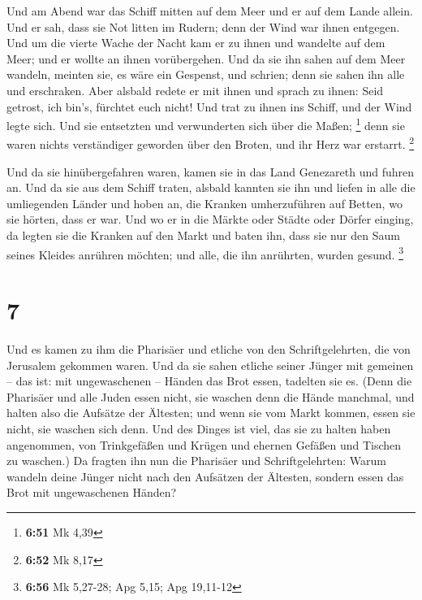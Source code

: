  Und am Abend war das Schiff mitten auf dem Meer und er
auf dem Lande allein.  Und er sah, dass sie Not litten im
Rudern; denn der Wind war ihnen entgegen. Und um die vierte Wache der
Nacht kam er zu ihnen und wandelte auf dem Meer;  und er
wollte an ihnen vorübergehen. Und da sie ihn sahen auf dem Meer wandeln,
meinten sie, es wäre ein Gespenst, und schrien;  denn sie
sahen ihn alle und erschraken. Aber alsbald redete er mit ihnen und
sprach zu ihnen: Seid getrost, ich bin's, fürchtet euch nicht!
 Und trat zu ihnen ins Schiff, und der Wind legte sich.
Und sie entsetzten und verwunderten sich über die Maßen; \footnote{\textbf{6:51}
  Mk 4,39}  denn sie waren nichts verständiger geworden
über den Broten, und ihr Herz war erstarrt. \footnote{\textbf{6:52} Mk
  8,17}

 Und da sie hinübergefahren waren, kamen sie in das Land
Genezareth und fuhren an.  Und da sie aus dem Schiff
traten, alsbald kannten sie ihn  und liefen in alle die
umliegenden Länder und hoben an, die Kranken umherzuführen auf Betten,
wo sie hörten, dass er war.  Und wo er in die Märkte oder
Städte oder Dörfer einging, da legten sie die Kranken auf den Markt und
baten ihn, dass sie nur den Saum seines Kleides anrühren möchten; und
alle, die ihn anrührten, wurden gesund. \footnote{\textbf{6:56} Mk
  5,27-28; Apg 5,15; Apg 19,11-12}

\hypertarget{section-1}{%
\section{7}\label{section-1}}

 Und es kamen zu ihm die Pharisäer und etliche von den
Schriftgelehrten, die von Jerusalem gekommen waren.  Und
da sie sahen etliche seiner Jünger mit gemeinen -- das ist: mit
ungewaschenen -- Händen das Brot essen, tadelten sie es. 
(Denn die Pharisäer und alle Juden essen nicht, sie waschen denn die
Hände manchmal, und halten also die Aufsätze der Ältesten;
 und wenn sie vom Markt kommen, essen sie nicht, sie
waschen sich denn. Und des Dinges ist viel, das sie zu halten haben
angenommen, von Trinkgefäßen und Krügen und ehernen Gefäßen und Tischen
zu waschen.)  Da fragten ihn nun die Pharisäer und
Schriftgelehrten: Warum wandeln deine Jünger nicht nach den Aufsätzen
der Ältesten, sondern essen das Brot mit ungewaschenen Händen?

